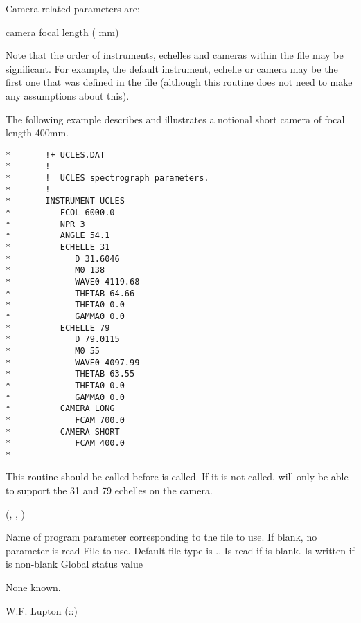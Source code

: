 \begin{manroutinedescription}
\begin{mandescription}
\end{mandescription}
     Camera-related parameters are:

\begin{mandescription}
   camera focal length ({} mm)

\end{mandescription}
     Note that the order of instruments, echelles and cameras within the
     file may be significant. For example, the default instrument, echelle
     or camera may be the first one that was defined in the file (although
     this routine does not need to make any assumptions about this).

     The following example describes {} and illustrates a %
notional short
     camera of focal length 400mm.
     \begin{verbatim}
*       !+ UCLES.DAT
*       !
*       !  UCLES spectrograph parameters.
*       !
*       INSTRUMENT UCLES
*          FCOL 6000.0
*          NPR 3
*          ANGLE 54.1
*          ECHELLE 31
*             D 31.6046
*             M0 138
*             WAVE0 4119.68
*             THETAB 64.66
*             THETA0 0.0
*             GAMMA0 0.0
*          ECHELLE 79
*             D 79.0115
*             M0 55
*             WAVE0 4097.99
*             THETAB 63.55
*             THETA0 0.0
*             GAMMA0 0.0
*          CAMERA LONG
*             FCAM 700.0
*          CAMERA SHORT
*             FCAM 400.0
*     \end{verbatim}
     This routine should be called before {} is called. If it %
is not
     called, {} will only be able to support the 31 and 79 %
echelles on
     the {} {} camera.

     {} {} ({}, {}, {%
})

\begin{manparametertable}
Name of program parameter
                                         corresponding to the file to use.
                                         If blank, no parameter is read
 File to use. Default file type is
                                         .{}. Is read if {} is blank. Is
                                         written if {} is non-blank
 Global status value
\end{manparametertable}
     None known.

     W.F. Lupton  {}  ({}::{})

\end{manroutinedescription}
